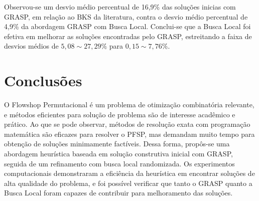 \documentclass[12pt]{article}
\begin{document}
Observou-se um desvio médio percentual de 16,9\% das soluções inicias com
GRASP, em relação ao BKS da literatura, contra o desvio médio percentual de
4,9\%  da
abordagem GRASP com Busca Local. Conclui-se 
que a Busca Local foi efetiva em melhorar as soluções encontradas pelo
GRASP, estreitando a faixa de desvios médios de $5,08 \sim 27,29\%$ para
$0,15 \sim 7,76\%$.

\section{Conclusões}

O Flowshop Permutacional é um problema de otimização combinatória relevante, e
métodos eficientes para solução de problema são de interesse acadêmico e
prático. Ao que se pode observar, métodos de resolução exata com programação
matemática são eficazes para resolver o PFSP, mas demandam muito tempo para
obtenção de soluções minimamente factíveis. Dessa forma, propôs-se uma
abordagem heurística baseada em solução construtiva inicial com GRASP, seguida
de um refinamento com busca local randomizada. Os experimentos computacionais
demonstraram a eficiência da heurística em encontrar soluções de alta qualidade
do problema, e foi possível verificar que tanto o GRASP quanto a Busca Local
foram capazes de contribuir para melhoramento das soluções.

% 
\end{document}
